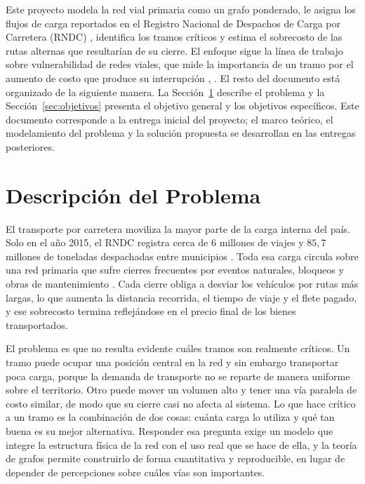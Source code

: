 \documentclass[conference]{IEEEtran}
\begin{document}
Este proyecto modela la red vial primaria como un grafo ponderado, le asigna los
flujos de carga reportados en el Registro Nacional de Despachos de Carga por
Carretera (RNDC) \cite{rndc}, identifica los tramos críticos y estima el
sobrecosto de las rutas alternas que resultarían de su cierre. El enfoque sigue
la línea de trabajo sobre vulnerabilidad de redes viales, que mide la
importancia de un tramo por el aumento de costo que produce su interrupción
\cite{jenelius2006}, \cite{scott2006}. El resto del documento está organizado de
la siguiente manera. La Sección~\ref{sec:descripcion} describe el problema y la
Sección~\ref{sec:objetivos} presenta el objetivo general y los objetivos
específicos. Este documento corresponde a la entrega inicial del proyecto; el
marco teórico, el modelamiento del problema y la solución propuesta se
desarrollan en las entregas posteriores.
\section{Descripción del Problema}
\label{sec:descripcion}

El transporte por carretera moviliza la mayor parte de la carga interna del
país. Solo en el año 2015, el RNDC registra cerca de $6$ millones de viajes y
$85{,}7$ millones de toneladas despachadas entre municipios \cite{rndc}. Toda
esa carga circula sobre una red primaria que sufre cierres frecuentes por
eventos naturales, bloqueos y obras de mantenimiento \cite{cambio_radiografia}.
Cada cierre obliga a desviar los vehículos por rutas más largas, lo que aumenta
la distancia recorrida, el tiempo de viaje y el flete pagado, y ese sobrecosto
termina reflejándose en el precio final de los bienes transportados.
 
El problema es que no resulta evidente cuáles tramos son realmente críticos. Un
tramo puede ocupar una posición central en la red y sin embargo transportar poca
carga, porque la demanda de transporte no se reparte de manera uniforme sobre el
territorio. Otro puede mover un volumen alto y tener una vía paralela de costo
similar, de modo que su cierre casi no afecta al sistema. Lo que hace crítico a
un tramo es la combinación de dos cosas: cuánta carga lo utiliza y qué tan buena
es su mejor alternativa. Responder esa pregunta exige un modelo que integre la
estructura física de la red con el uso real que se hace de ella, y la teoría de
grafos permite construirlo de forma cuantitativa y reproducible, en lugar de
depender de percepciones sobre cuáles vías son importantes.
 
\end{document}
